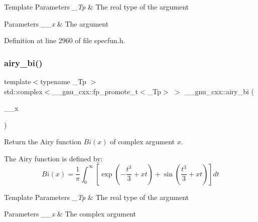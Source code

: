\begin{DoxyTemplParams}{Template Parameters}
{\em \+\_\+\+Tp} & The real type of the argument \\
\hline
\end{DoxyTemplParams}

\begin{DoxyParams}{Parameters}
{\em \+\_\+\+\_\+x} & The argument \\
\hline
\end{DoxyParams}


Definition at line 2960 of file specfun.\+h.

\mbox{\label{group__gnu__math__spec__func_ga27cfc90cf84fae2acb2d55a9409ea49c}} 
\subsubsection{\texorpdfstring{airy\+\_\+bi()}{airy\_bi()}\hspace{0.1cm}{\footnotesize\ttfamily [2/2]}}
{\footnotesize\ttfamily template$<$typename \+\_\+\+Tp $>$ \\
std\+::complex$<$\+\_\+\+\_\+gnu\+\_\+cxx\+::fp\+\_\+promote\+\_\+t$<$\+\_\+\+Tp$>$ $>$ \+\_\+\+\_\+gnu\+\_\+cxx\+::airy\+\_\+bi (\begin{DoxyParamCaption}\item[{std\+::complex$<$ \+\_\+\+Tp $>$}]{\+\_\+\+\_\+x }\end{DoxyParamCaption})\hspace{0.3cm}{\ttfamily [inline]}}

Return the Airy function $ Bi(x) $ of complex argument $ x $.

The Airy function is defined by\+: \[ Bi(x) = \frac{1}{\pi}\int_0^\infty \left[ \exp \left(-\frac{t^3}{3} + xt \right) + \sin \left(\frac{t^3}{3} + xt \right) \right] dt \]


\begin{DoxyTemplParams}{Template Parameters}
{\em \+\_\+\+Tp} & The real type of the argument \\
\hline
\end{DoxyTemplParams}

\begin{DoxyParams}{Parameters}
{\em \+\_\+\+\_\+x} & The complex argument \\
\hline
\end{DoxyParams}


